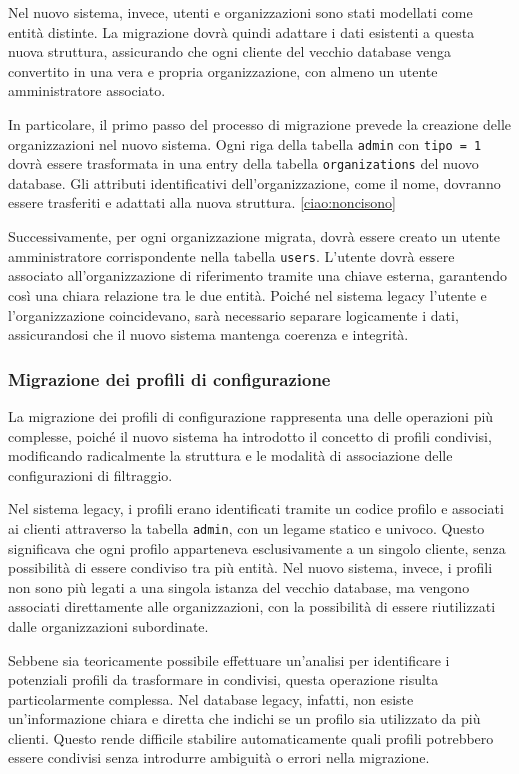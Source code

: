 Nel nuovo sistema, invece, utenti e organizzazioni sono stati modellati come entità distinte. La migrazione dovrà quindi adattare i dati esistenti a questa nuova struttura, assicurando che ogni cliente del vecchio database venga convertito in una vera e propria organizzazione, con almeno un utente amministratore associato.

In particolare, il primo passo del processo di migrazione prevede la creazione delle organizzazioni nel nuovo sistema. Ogni riga della tabella \texttt{admin} con \texttt{tipo = 1} dovrà essere trasformata in una entry della tabella \texttt{organizations} del nuovo database. Gli attributi identificativi dell’organizzazione, come il nome, dovranno essere trasferiti e adattati alla nuova struttura.
\ref{ciao:noncisono}

Successivamente, per ogni organizzazione migrata, dovrà essere creato un utente amministratore corrispondente nella tabella \texttt{users}. L’utente dovrà essere associato all’organizzazione di riferimento tramite una chiave esterna, garantendo così una chiara relazione tra le due entità. Poiché nel sistema legacy l'utente e l'organizzazione coincidevano, sarà necessario separare logicamente i dati, assicurandosi che il nuovo sistema mantenga coerenza e integrità.

\subsubsection{Migrazione dei profili di configurazione}
La migrazione dei profili di configurazione rappresenta una delle operazioni più complesse, poiché il nuovo sistema ha introdotto il concetto di profili condivisi, modificando radicalmente la struttura e le modalità di associazione delle configurazioni di filtraggio.

Nel sistema legacy, i profili erano identificati tramite un codice profilo e associati ai clienti attraverso la tabella \texttt{admin}, con un legame statico e univoco. Questo significava che ogni profilo apparteneva esclusivamente a un singolo cliente, senza possibilità di essere condiviso tra più entità. Nel nuovo sistema, invece, i profili non sono più legati a una singola istanza del vecchio database, ma vengono associati direttamente alle organizzazioni, con la possibilità di essere riutilizzati dalle organizzazioni subordinate.

Sebbene sia teoricamente possibile effettuare un'analisi per identificare i potenziali profili da trasformare in condivisi, questa operazione risulta particolarmente complessa. Nel database legacy, infatti, non esiste un'informazione chiara e diretta che indichi se un profilo sia utilizzato da più clienti. Questo rende difficile stabilire automaticamente quali profili potrebbero essere condivisi senza introdurre ambiguità o errori nella migrazione.

